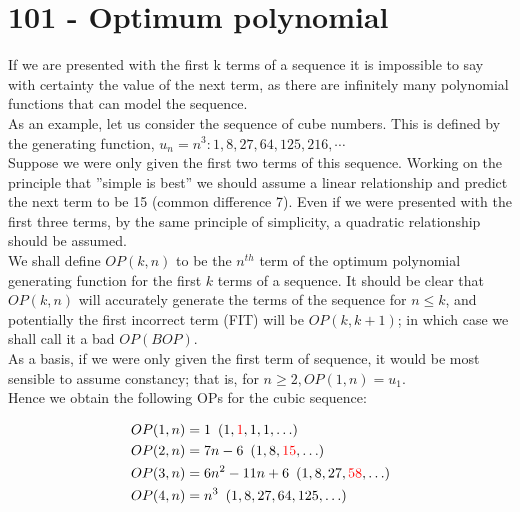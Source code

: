 \chapter*{101 - Optimum polynomial}

If we are presented with the first k terms of a sequence it is impossible to say with certainty the value of the next term, as there are infinitely many polynomial functions that can model the sequence.\\

As an example, let us consider the sequence of cube numbers. This is defined by the generating function, 
$u_n = n^3: 1, 8, 27, 64, 125, 216, \cdots$\\

Suppose we were only given the first two terms of this sequence. Working on the principle that ''simple is best'' we should assume a linear relationship and predict the next term to be 15 (common difference 7). Even if we were presented with the first three terms, by the same principle of simplicity, a quadratic relationship should be assumed.\\

We shall define $OP(k, n)$ to be the $n^{th}$ term of the optimum polynomial generating function for the first $k$ terms of a sequence. It should be clear that $OP(k, n)$ will accurately generate the terms of the sequence for $n \leq k$, and potentially the first incorrect term (FIT) will be $OP(k, k+1)$; in which case we shall call it a bad $OP (BOP)$.\\

As a basis, if we were only given the first term of sequence, it would be most sensible to assume constancy; that is, for $n \geq 2, OP(1, n) = u_1$.\\

Hence we obtain the following OPs for the cubic sequence:

\begin{align*}  
    OP(1, n) &= 1 \hphantom{4} (1, \textcolor{red}{1}, 1, 1, \ldots) \\
    OP(2, n) &= 7n-6 \hphantom{4} (1, 8, \textcolor{red}{15}, \ldots) \\
    OP(3, n) &= 6n^2-11n+6 \hphantom{4} (1, 8, 27, \textcolor{red}{58}, \ldots) \\
    OP(4, n) &= n^3 \hphantom{4} (1, 8, 27, 64, 125, \ldots) \\
\end{align*}

